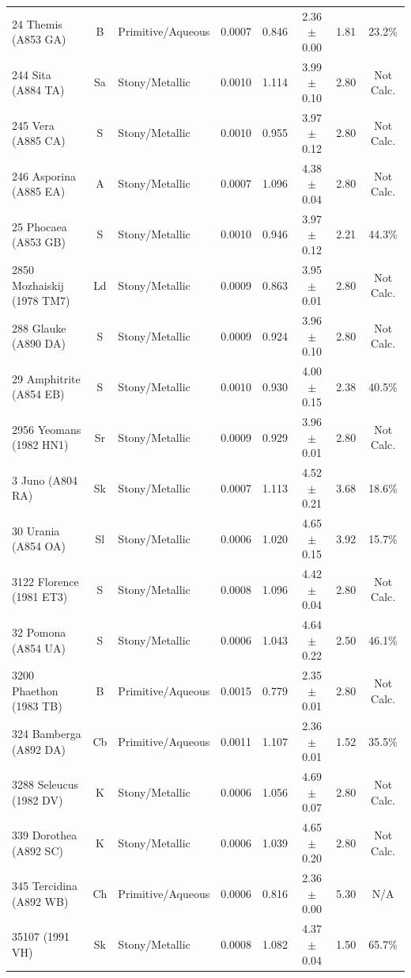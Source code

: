 {\begin{longtable}{p{2.6cm} c p{2.2cm} c c c c c}
24 Themis (A853 GA) & B & Primitive/Aqueous & 0.0007 & 0.846 & 2.36 $\pm$ 0.00 & 1.81 & 23.2\% \\
244 Sita (A884 TA) & Sa & Stony/Metallic & 0.0010 & 1.114 & 3.99 $\pm$ 0.10 & 2.80 & Not Calc. \\
245 Vera (A885 CA) & S & Stony/Metallic & 0.0010 & 0.955 & 3.97 $\pm$ 0.12 & 2.80 & Not Calc. \\
246 Asporina (A885 EA) & A & Stony/Metallic & 0.0007 & 1.096 & 4.38 $\pm$ 0.04 & 2.80 & Not Calc. \\
25 Phocaea (A853 GB) & S & Stony/Metallic & 0.0010 & 0.946 & 3.97 $\pm$ 0.12 & 2.21 & 44.3\% \\
2850 Mozhaiskij (1978 TM7) & Ld & Stony/Metallic & 0.0009 & 0.863 & 3.95 $\pm$ 0.01 & 2.80 & Not Calc. \\
288 Glauke (A890 DA) & S & Stony/Metallic & 0.0009 & 0.924 & 3.96 $\pm$ 0.10 & 2.80 & Not Calc. \\
29 Amphitrite (A854 EB) & S & Stony/Metallic & 0.0010 & 0.930 & 4.00 $\pm$ 0.15 & 2.38 & 40.5\% \\
2956 Yeomans (1982 HN1) & Sr & Stony/Metallic & 0.0009 & 0.929 & 3.96 $\pm$ 0.01 & 2.80 & Not Calc. \\
3 Juno (A804 RA) & Sk & Stony/Metallic & 0.0007 & 1.113 & 4.52 $\pm$ 0.21 & 3.68 & 18.6\% \\
30 Urania (A854 OA) & Sl & Stony/Metallic & 0.0006 & 1.020 & 4.65 $\pm$ 0.15 & 3.92 & 15.7\% \\
3122 Florence (1981 ET3) & S & Stony/Metallic & 0.0008 & 1.096 & 4.42 $\pm$ 0.04 & 2.80 & Not Calc. \\
32 Pomona (A854 UA) & S & Stony/Metallic & 0.0006 & 1.043 & 4.64 $\pm$ 0.22 & 2.50 & 46.1\% \\
3200 Phaethon (1983 TB) & B & Primitive/Aqueous & 0.0015 & 0.779 & 2.35 $\pm$ 0.01 & 2.80 & Not Calc. \\
324 Bamberga (A892 DA) & Cb & Primitive/Aqueous & 0.0011 & 1.107 & 2.36 $\pm$ 0.01 & 1.52 & 35.5\% \\
3288 Seleucus (1982 DV) & K & Stony/Metallic & 0.0006 & 1.056 & 4.69 $\pm$ 0.07 & 2.80 & Not Calc. \\
339 Dorothea (A892 SC) & K & Stony/Metallic & 0.0006 & 1.039 & 4.65 $\pm$ 0.20 & 2.80 & Not Calc. \\
345 Tercidina (A892 WB) & Ch & Primitive/Aqueous & 0.0006 & 0.816 & 2.36 $\pm$ 0.00 & 5.30 & N/A \\
35107 (1991 VH) & Sk & Stony/Metallic & 0.0008 & 1.082 & 4.37 $\pm$ 0.04 & 1.50 & 65.7\% \\

\end{longtable}}
